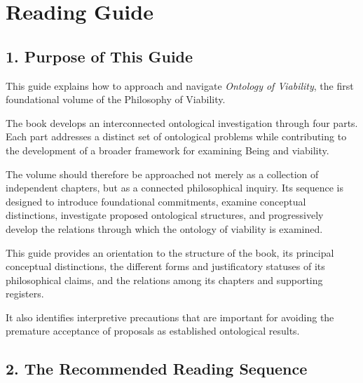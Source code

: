 
\cleardoublepage

\chapter*{Reading Guide}


\section*{1. Purpose of This Guide}

This guide explains how to approach and navigate
\textit{Ontology of Viability}, the first foundational
volume of the Philosophy of Viability.

The book develops an interconnected ontological
investigation through four parts. Each part addresses
a distinct set of ontological problems while
contributing to the development of a broader
framework for examining Being and viability.

The volume should therefore be approached not merely
as a collection of independent chapters, but as
a connected philosophical inquiry. Its sequence
is designed to introduce foundational commitments,
examine conceptual distinctions, investigate proposed
ontological structures, and progressively develop
the relations through which the ontology of viability
is examined.

This guide provides an orientation to the structure
of the book, its principal conceptual distinctions,
the different forms and justificatory statuses of
its philosophical claims, and the relations among
its chapters and supporting registers.

It also identifies interpretive precautions that
are important for avoiding the premature acceptance
of proposals as established ontological results.


\section*{2. The Recommended Reading Sequence}

